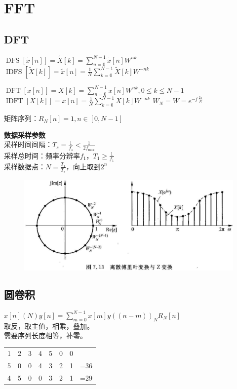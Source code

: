 \section{FFT}
\subsection{DFT}
\(\operatorname{DFS}[\tilde{x}[n]]=\widetilde{X}[k]=\sum_{n=0}^{N-1} \tilde{x}[n] W^{n k}\)
\(\operatorname{IDFS}[\widetilde{X}[k]]=\tilde{x}[n]=\frac{1}{N} \sum_{k=0}^{N-1} \widetilde{X}[k] W^{-n k}\)

\(\displaystyle \operatorname{DFT}[x[n]]=X[k]=\sum_{n=0}^{N -1} x[n] W^{n k}, 0 \leq  k \leq  N-1\)
\(\displaystyle \operatorname{IDFT}[X[k]]=x[n]=\frac{1}{N} \sum_{k=0}^{N-1} X[k] W^{-n k}\)
\(W_N=W=e^{-j\,\frac{2\pi}{N}}\)

矩阵序列：\(R_N[n]=1,n\in [0,N-1]\)

\textbf{数据采样参数}\\
采样时间间隔：\(T_s=\frac{1}{f_s}<\frac{1}{2f_{\max}}\)\\
采样总时间：频率分辨率\(f_1\)，\(T_1\geq\frac{1}{f_1}\)\\
采样数据点：\(N=\frac{T_1}{T_s}\)，向上取到\(2^n\)\\

\vspace{-10pt}
\begin{figure}[H]
    \centering
    \includegraphics[width=\linewidth]{figure/Pasted image 20220611024619.png}
\end{figure}
\vspace{-10pt}

\subsection{圆卷积}
$x[n] (N) y[n] =\sum_{m=0}^{N-1} x[m]y((n-m))_N R_N[n]$\\
取反，取主值，相乘，叠加。\\
需要序列长度相等，补零。
\vspace{-10pt}
\begin{table}[H]
    \tiny
    \setlength{\parskip}{-2pt plus 0.5ex}
    \begin{tabular}{@{}cccccccl@{}}
    1 & 2 & 3 & 4 & 5 & 0 & 0 &     \\ \cmidrule(r){1-7}
    5 & 0 & 0 & 4 & 3 & 2 & 1 & =36 \\
    4 & 5 & 0 & 0 & 3 & 2 & 1 & =29 \\
    \end{tabular}
\end{table}
\vspace{-10pt}

